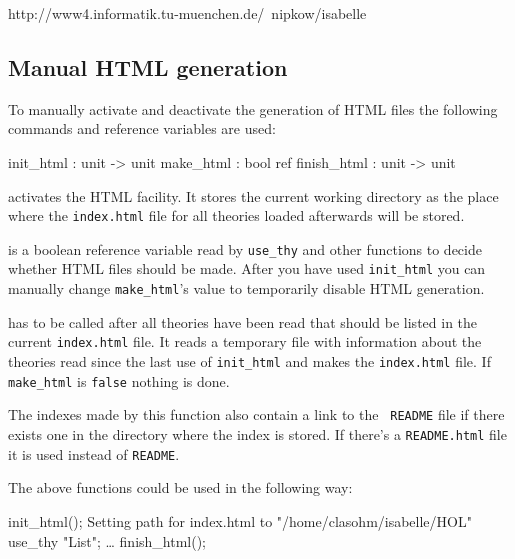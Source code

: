 \begin{ttbox}
http://www4.informatik.tu-muenchen.de/~nipkow/isabelle
\end{ttbox}


\subsection*{Manual HTML generation}

To manually activate and deactivate the generation of HTML files the
following commands and reference variables are used:

\begin{ttbox}
init_html   : unit -> unit
make_html   : bool ref
finish_html : unit -> unit
\end{ttbox}

\begin{ttdescription}
\item[\ttindexbold{init_html}]
activates the HTML facility. It stores the current working directory
as the place where the {\tt index.html} file for all theories loaded
afterwards will be stored.

\item[\ttindexbold{make_html}]
is a boolean reference variable read by {\tt use_thy} and other
functions to decide whether HTML files should be made. After you have
used {\tt init_html} you can manually change {\tt make_html}'s value
to temporarily disable HTML generation.

\item[\ttindexbold{finish_html}]
has to be called after all theories have been read that should be
listed in the current {\tt index.html} file. It reads a temporary
file with information about the theories read since the last use of
{\tt init_html} and makes the {\tt index.html} file. If {\tt
make_html} is {\tt false} nothing is done.

The indexes made by this function also contain a link to the {\tt
README} file if there exists one in the directory where the index is
stored. If there's a {\tt README.html} file it is used instead of
{\tt README}.

\end{ttdescription}

The above functions could be used in the following way:

\begin{ttbox}
init_html();
{\out Setting path for index.html to "/home/clasohm/isabelle/HOL"}
use_thy "List";
\dots
finish_html();
\end{ttbox}

